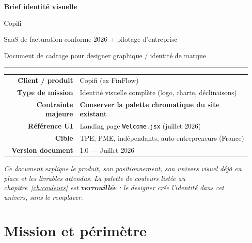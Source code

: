 \documentclass[11pt,a4paper]{report}
\begin{document}
\begin{titlepage}
    \centering
    \vspace*{1.2cm}
    {\Huge\bfseries\color{copifiobsidian} Brief identité visuelle\par}
    \vspace{0.6cm}
    {\LARGE\color{copifiemerald} Copifi\par}
    \vspace{0.4cm}
    {\large SaaS de facturation conforme 2026 + pilotage d'entreprise\par}
    \vspace{0.3cm}
    {\normalsize Document de cadrage pour designer graphique / identité de marque\par}
    \vspace{1.4cm}
    \rule{0.78\textwidth}{1pt}
    \vspace{1cm}
    \begin{tabular}{>{\bfseries}r p{9.2cm}}
        Client / produit & Copifi (ex FinFlow) \\
        Type de mission & Identité visuelle complète (logo, charte, déclinaisons) \\
        Contrainte majeure & \textbf{Conserver la palette chromatique du site existant} \\
        Référence UI & Landing page \texttt{Welcome.jsx} (juillet 2026) \\
        Cible & TPE, PME, indépendants, auto-entrepreneurs (France) \\
        Version document & 1.0 — Juillet 2026 \\
    \end{tabular}
    \vfill
    \begin{minipage}{0.85\textwidth}
        \centering
        \small\itshape
        Ce document explique le produit, son positionnement, son univers visuel déjà en place
        et les livrables attendus. La palette de couleurs listée au chapitre~\ref{ch:couleurs}
        est \textbf{verrouillée} : le designer crée l'identité \emph{dans} cet univers, sans le remplacer.
    \end{minipage}
\end{titlepage}

\tableofcontents
\cleardoublepage

\chapter{Mission et périmètre}
\end{document}
